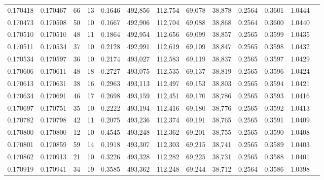 \begin{tabular}{rrrrrrrrrrrrr}
0.170418 & 0.170467 &    66 &  13 &                                     0.1646 & 492,856 & 112,754 &  69,078 &  38,878 & 0.2564 & 0.3601 & 1.0444 \\
0.170473 & 0.170508 &    50 &  10 &                                     0.1667 & 492,906 & 112,704 &  69,088 &  38,868 & 0.2564 & 0.3600 & 1.0440 \\
0.170510 & 0.170510 &    48 &  11 &                                     0.1864 & 492,954 & 112,656 &  69,099 &  38,857 & 0.2565 & 0.3599 & 1.0435 \\
0.170511 & 0.170534 &    37 &  10 &                                     0.2128 & 492,991 & 112,619 &  69,109 &  38,847 & 0.2565 & 0.3598 & 1.0432 \\
0.170534 & 0.170597 &    36 &  10 &                                     0.2174 & 493,027 & 112,583 &  69,119 &  38,837 & 0.2565 & 0.3597 & 1.0429 \\
0.170606 & 0.170611 &    48 &  18 &                                     0.2727 & 493,075 & 112,535 &  69,137 &  38,819 & 0.2565 & 0.3596 & 1.0424 \\
0.170613 & 0.170631 &    38 &  16 &                                     0.2963 & 493,113 & 112,497 &  69,153 &  38,803 & 0.2565 & 0.3594 & 1.0421 \\
0.170634 & 0.170691 &    46 &  17 &                                     0.2698 & 493,159 & 112,451 &  69,170 &  38,786 & 0.2565 & 0.3593 & 1.0416 \\
0.170697 & 0.170751 &    35 &  10 &                                     0.2222 & 493,194 & 112,416 &  69,180 &  38,776 & 0.2565 & 0.3592 & 1.0413 \\
0.170782 & 0.170798 &    42 &  11 &                                     0.2075 & 493,236 & 112,374 &  69,191 &  38,765 & 0.2565 & 0.3591 & 1.0409 \\
0.170800 & 0.170800 &    12 &  10 &                                     0.4545 & 493,248 & 112,362 &  69,201 &  38,755 & 0.2565 & 0.3590 & 1.0408 \\
0.170801 & 0.170859 &    59 &  14 &                                     0.1918 & 493,307 & 112,303 &  69,215 &  38,741 & 0.2565 & 0.3589 & 1.0403 \\
0.170862 & 0.170913 &    21 &  10 &                                     0.3226 & 493,328 & 112,282 &  69,225 &  38,731 & 0.2565 & 0.3588 & 1.0401 \\
0.170919 & 0.170941 &    34 &  19 &                                     0.3585 & 493,362 & 112,248 &  69,244 &  38,712 & 0.2564 & 0.3586 & 1.0398 \\

\end{tabular}
